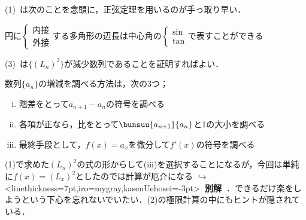 \documentclass[10pt,
b5paper,
fleqn,
dvipdfmx,
uplatex
]{jsarticle}
\newcommand{\benu}{\begin{enumerate}}
\newcommand{\eenu}{\end{enumerate}}
\newcommand{\bb}{\bf\boldmath}%
\newcommand{\barr}{\left\{\begin{array}{l}}
\newcommand{\earr}{\end{array}\right.}
\renewenvironment{leftbar}{%
\def\FrameCommand{\vrule width 1pt \hspace{1zw}}
\MakeFramed{\advance\hsize-\width \FrameRestore}}%
{\endMakeFramed}
\newenvironment{アプローチ}{
\hspace{-2zw}\underbar{\large \bf Approach}\vspace{-1zw}\begin{leftbar}}{\end{leftbar}}
\newcommand{\bekkai}{{\bb \color{mygray} $\hookrightarrow$}\phkasen<linethickness=7pt,iro=mygray,kasenUehosei=-3pt>{\bf \ 別解\ }}
\newif\ifkaisetu
\begin{document}
{\ifkaisetu
\begin{アプローチ}
(1)\ は次のことを念頭に，正弦定理を用いるのが手っ取り早い．
\begin{tcolorbox}[title={\bb 円の内接/外接多角形の辺長},coltitle=black,
enhanced,
frame style={left color=orange!50!white,right color=black!50!orange},
colback=black!0!white,
drop fuzzy shadow
]
円に$\barr 内接\\外接\earr$する多角形の辺長は中心角の$\barr \sin\\ \tan\earr$で表すことができる
\end{tcolorbox}
(3)\ は$\{(L_n)^2\}$が減少数列であることを証明すればよい．
\begin{tcolorbox}[title={\bb 数列の増減},coltitle=black,
enhanced,
frame style={left color=orange!50!white,right color=black!50!orange},
colback=black!0!white,
drop fuzzy shadow
]
数列$\{a_n\}$の増減を調べる方法は，次の3つ；
\benu[(i)]
\item 階差をとって$a_{n+1}-a_n$の符号を調べる
\item 各項が正なら，比をとって$\bunsuu{a_{n+1}}{a_n}$と1の大小を調べる
\item 最終手段として，$f(x)=a_x$を微分して$f'(x)$の符号を調べる
\eenu
\end{tcolorbox}
(1)で求めた$(L_n)^2$の式の形からして(iii)を選択することになるが，今回は単純に$f(x)=(L_x)^2$としたのでは計算が厄介になる\bekkai．できるだけ楽をしようという下心を忘れないでいたい．(2)の極限計算の中にもヒントが隠されている．
\end{アプローチ}

}
\end{document}

